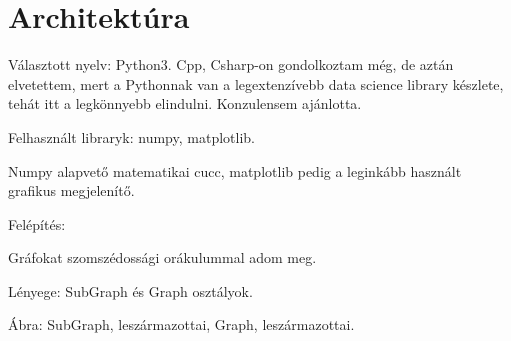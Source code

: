 \chapter{Architektúra}

Választott nyelv: Python3. Cpp, Csharp-on gondolkoztam még, de aztán elvetettem,
mert a Pythonnak van a legextenzívebb data science library készlete, tehát
itt a legkönnyebb elindulni. Konzulensem ajánlotta.

Felhasznált libraryk: numpy, matplotlib.

Numpy alapvető matematikai cucc, matplotlib pedig a leginkább használt grafikus megjelenítő.

Felépítés:

Gráfokat szomszédossági orákulummal adom meg.

Lényege: SubGraph és Graph osztályok.

Ábra: SubGraph, leszármazottai, Graph, leszármazottai.


